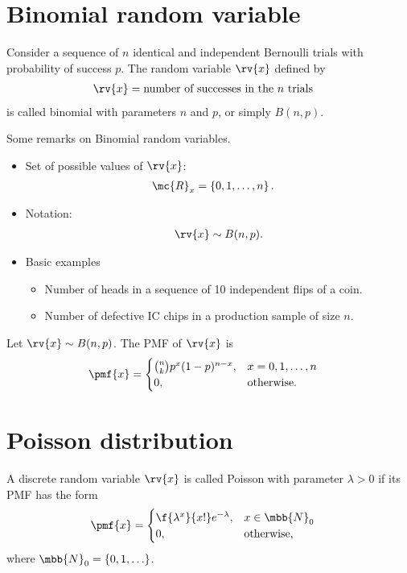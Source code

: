 \section{Binomial random variable}
\begin{definitionBox}
    Consider a sequence of $n$ identical and independent Bernoulli trials with probability of success $p$. The random variable $\rv{x}$ defined by
    \begin{align}
        \rv{x} &= \text{number of successes in the $n$ trials}
    \end{align}
    is called binomial with parameters $n$ and $p$, or simply $B(n,p)$.
\end{definitionBox}
\begin{myremark}
    Some remarks on Binomial random variables.
    \begin{itemize}
        \item Set of possible values of $\rv{x}$:
        \begin{align}
            \mc{R}_{x} &= \left\{ 0, 1, \ldots, n\right\}.
        \end{align}
        \item Notation:
        \begin{align}
            \rv{x} \sim B(n, p).
        \end{align}
        \item Basic examples
        \begin{itemize}
            \item Number of heads in a sequence of 10 independent flips of a coin.
            \item Number of defective IC chips in a production sample of size $n$.
        \end{itemize}
    \end{itemize}
\end{myremark}
\begin{mytheorem}
   Let $\rv{x}\sim B(n,p)$. The PMF of $\rv{x}$ is
   \begin{align}
       \pmf{x} &= 
       \begin{cases}
           \binom{n}{k} p^{x}(1-p)^{n-x}, &x = 0, 1, \ldots, n\\
           0, &\text{otherwise}.
       \end{cases}
   \end{align}
\end{mytheorem}


\section{Poisson distribution}
A discrete random variable $\rv{x}$ is called Poisson with parameter $\lambda > 0$ if its PMF has the form
\begin{align}
    \pmf{x} &= 
    \begin{cases}
        \f{\lambda^{x}}{x!}e^{-\lambda}, &x\in\mbb{N}_{0}\\
        0, &\text{otherwise},
    \end{cases}
\end{align}
where $\mbb{N}_{0} = \left\{ 0, 1, \ldots\right\}$.

